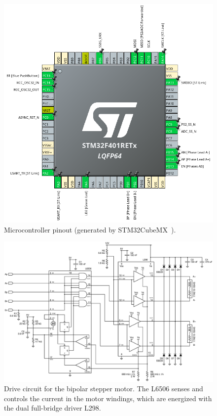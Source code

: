 \begin{figure}
    \centering
    \includegraphics[width=.65\linewidth]{../gfx/mcu_pinout.png}
    \caption{Microcontroller pinout (generated by STM32CubeMX~\cite{cubemx}).}
    \label{fig:mcu_pins}
\end{figure}

\begin{figure}
    \centering
    \includegraphics[width=.8\linewidth]{../gfx/motor_board.eps}
    \caption{Drive circuit for the bipolar stepper motor. The L6506 senses and controls the current in the motor windings, which are energized with the dual full-bridge driver L298.}
    \label{fig:motor_bd}
\end{figure}

